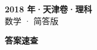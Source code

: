 \documentclass[zihao=-4, a4paper]{ctexart}
\begin{document}
\begin{center}
  {\Large\bfseries 2018 年·天津卷·理科}\\[4pt]
  {\large 数学 · 简答版}
\end{center}
\medskip
{}

\clearpage
{}
\begin{center}{\Large\bfseries 答案速查}\end{center}
\medskip

\end{document}
